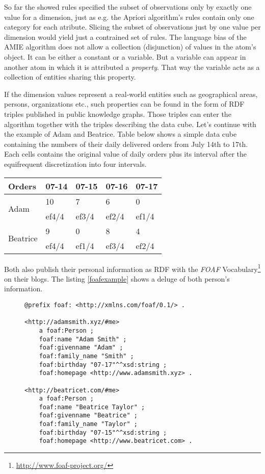 So far the showed rules specified the subset of observations only by exactly one value for a dimension, just as e.g. the Apriori algorithm's rules contain only one category for each atribute. Slicing the subset of observations just by one value per dimension would yield just a contrained set of rules. The language bias of the AMIE algorithm does not allow a collection (disjunction) of values in the atom's object. It can be either a constant or a variable. But a variable can appear in another atom in which it is attributed a \textit{property}. That way the variable acts as a collection of entities sharing this property.

If the dimension values represent a real-world entities such as geographical areas, persons, organizations etc., such properties can be found in the form of RDF triples published in public knowledge graphs. Those triples can enter the algorithm together with the triples describing the data cube. Let's continue with the example of Adam and Beatrice. Table below shows a simple data cube containing the numbers of their daily delivered orders from July 14th to 17th. Each cells contains the original value of daily orders plus its interval after the equifrequent discretization into four intervals.

\begin{table}[h]
\centering
\begin{tabular}{l|llll}
Orders                    & 07-14 & 07-15 & 07-16 & 07-17  \\ 
\hline
\multirow{2}{*}{Adam}     & 10    & 7     & 6     & 0      \\
                         & ef4/4 & ef3/4 & ef2/4 & ef1/4  \\
\multirow{2}{*}{Beatrice} & 9     & 0     & 8     & 4      \\
                          & ef4/4 & ef1/4 & ef3/4 & ef2/4 
\end{tabular}
\end{table}

Both also publish their personal information as RDF with the \textit{FOAF} Vocabulary\footnote{\href{http://www.foaf-project.org/}{http://www.foaf-project.org/}} on their blogs. The listing \ref{foafexample} shows a deluge of both person's information.

\begin{figure}[h]
\begin{lstlisting}[language = turtle, caption={RDF data published on Adam's and Beatrice's personal blogs}, label={foafexample},captionpos=b escapeinside={(*@}{@*)}]
@prefix foaf: <http://xmlns.com/foaf/0.1/> .

<http://adamsmith.xyz/#me>
    a foaf:Person ;
    foaf:name "Adam Smith" ;
    foaf:givenname "Adam" ;
    foaf:family_name "Smith" ;
    foaf:birthday "07-17"^^xsd:string ;
    foaf:homepage <http://www.adamsmith.xyz> .
      
<http://beatricet.com/#me>
    a foaf:Person ;
    foaf:name "Beatrice Taylor" ;
    foaf:givenname "Beatrice" ;
    foaf:family_name "Taylor" ;
    foaf:birthday "07-15"^^xsd:string ;
    foaf:homepage <http://www.beatricet.com> .
\end{lstlisting}
\end{figure}

